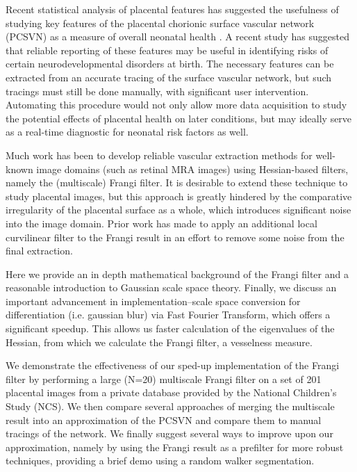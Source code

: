 

Recent statistical analysis of placental features has suggested the usefulness
of studying key features of the placental chorionic surface vascular network
(PCSVN) as a measure of overall neonatal health \cite{chang2017}. A recent
study has suggested that reliable reporting of these features may be useful in
identifying risks of certain neurodevelopmental disorders at birth. The
necessary features can be extracted from an accurate tracing of the surface
vascular network, but such tracings must still be done manually, with
significant user intervention. Automating this procedure would not only allow
more data acquisition to study the potential effects of placental health on
later conditions, but may ideally serve as a real-time diagnostic for neonatal
risk factors as well.

Much work has been to develop reliable vascular extraction methods for
well-known image domains (such as retinal MRA images) using Hessian-based
filters, namely the (multiscale) Frangi filter. It is desirable to extend these
technique to study placental images, but this approach is greatly hindered by
the comparative irregularity of the placental surface as a whole, which
introduces significant noise into the image domain.  Prior work
\cite{huynh2013filter} has made to apply an additional local curvilinear filter
to the Frangi result in an effort to remove some noise from the final
extraction.

Here we provide an in depth mathematical background of the Frangi filter and a
reasonable introduction to Gaussian scale space theory. Finally, we discuss an
important advancement in implementation--scale space conversion for
differentiation (i.e. gaussian blur) via Fast Fourier Transform, which offers a
significant speedup. This allows us faster calculation of the eigenvalues of
the Hessian, from which we calculate the Frangi filter, a vesselness measure.

We demonstrate the effectiveness of our sped-up implementation of the Frangi
filter by performing a large (N=20) multiscale Frangi filter on a set of 201
placental images from a private database provided by the National Children's
Study (NCS). We then compare several approaches of merging the multiscale
result into an approximation of the PCSVN and compare them to manual tracings
of the network. We finally suggest several ways to improve upon our
approximation, namely by using the Frangi result as a prefilter for more robust
techniques, providing a brief demo using a random walker segmentation.



